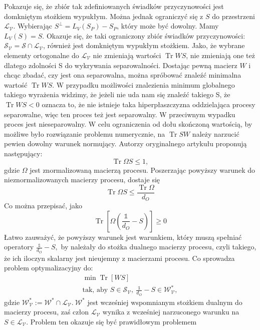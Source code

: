 \documentclass[10pt]{article} %
\DeclareMathOperator{\Trs}{Tr}
\newcommand{\I}{\mathbb{1}}
\begin{document}
Pokazuje się, że zbiór tak zdefiniowanych świadków przyczynowości jest domkniętym stożkiem wypukłym. Można jednak ograniczyć się z $S$ do przestrzeni 
$\mathcal{L_V}$. Wybierając $S^\bot = L_V(S_P) - S_P$, który może być dowolny. Mamy $L_V(S) = S$. Okazuje się, że taki ograniczony zbiór świadków przyczynowości: $\mathcal{S_V} = \mathcal{S} \cap \mathcal{L_V}$, również jest domkniętym wypukłym stożkiem. Jako, że wybrane elementy ortogonalne do
$\mathcal{L_V}$ nie zmieniają wartości $\Trs WS$, nie zmieniają one też dlatego zdolności S do wykrywania separowalności. 
Dostając pewną macierz $W$ i chcąc zbadać, czy jest ona separowalna, można spróbować znaleźć minimalna wartość $\Trs WS$. W przypadku możliwości 
znalezienia minimum globalnego takiego wyrażenia widzimy, że jeżeli nie uda nam się znaleźć takiego S, że $\Trs WS < 0$ oznacza to, że nie istnieje
taka hiperpłaszczyzna oddzielająca procesy separowalne, więc ten proces też jest separowalny. W przeciwnym wypadku proces jest nieseparowalny.
W celu ograniczenia od dołu skończoną wartością, by możliwe było rozwiązanie problemu numerycznie, na $\Trs SW$ należy narzucić pewien dowolny warunek normujący.
Autorzy oryginalnego artykułu proponują następujący:
\begin{equation}
\Trs \Omega S \leq 1,
\end{equation}
gdzie $\Omega$ jest znormalizowaną macierzą procesu.
Poszerzając powyższy warunek do nieznormalizowanych macierzy procesu, dostaje się
\begin{equation}
\Trs \Omega S \leq \frac{\Trs \Omega}{d_O}
\end{equation}
Co można przepisać, jako 
\begin{equation}
\Trs \left[ \Omega(\frac{\I}{d_O} -S) \right] \geq 0
\end{equation}
Łatwo zauważyć, że powyższy warunek jest warunkiem, który muszą spełniać operatory $\frac{\I}{d_O} - S,$ by należały do stożka dualnego macierzy procesu, czyli takiego, że ich iloczyn skalarny jest nieujemny z macierzami procesu. Co sprowadza problem optymalizacyjny do:
\begin{gather}
\min \Trs \left[ WS \right]\\
\text{tak, aby } S \in \mathcal{S_V},~ \frac{\I}{d_O} - S \in \mathcal{W^*_V},
\end{gather}
gdzie $\mathcal{W^*_V}:=\mathcal{W^*} \cap \mathcal{L_V}.~ \mathcal{W^*}$ jest wcześniej wspomnianym stożkiem dualnym do macierzy procesu,
zaś człon $\mathcal{L_V}$ wynika z wcześniej narzuconego warunku na $S \in \mathcal{L_V}$. Problem ten okazuje się być prawidłowym problemem
\end{document}
